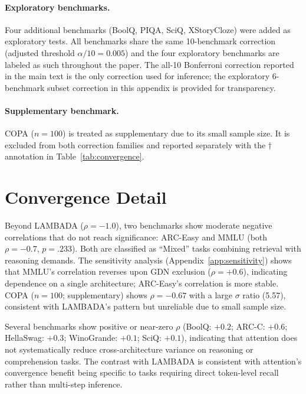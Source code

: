 \paragraph{Exploratory benchmarks.} Four additional benchmarks (BoolQ, PIQA, SciQ, XStoryCloze) were added as exploratory tests. All benchmarks share the same 10-benchmark correction (adjusted threshold $\alpha / 10 = 0.005$) and the four exploratory benchmarks are labeled as such throughout the paper. The all-10 Bonferroni correction reported in the main text is the only correction used for inference; the exploratory 6-benchmark subset correction in this appendix is provided for transparency.

\paragraph{Supplementary benchmark.} COPA ($n = 100$) is treated as supplementary due to its small sample size. It is excluded from both correction families and reported separately with the $\dagger$ annotation in Table~\ref{tab:convergence}.

\section{Convergence Detail}\label{app:convergence_detail}


Beyond LAMBADA ($\rho = -1.0$), two benchmarks show moderate negative correlations that do not reach significance: ARC-Easy and MMLU (both $\rho = -0.7$, $p = .233$). Both are classified as ``Mixed'' tasks combining retrieval with reasoning demands. The sensitivity analysis (Appendix~\ref{app:sensitivity}) shows that MMLU's correlation reverses upon GDN exclusion ($\rho = +0.6$), indicating dependence on a single architecture; ARC-Easy's correlation is more stable. COPA ($n = 100$; supplementary) shows $\rho = -0.67$ with a large $\sigma$ ratio (5.57), consistent with LAMBADA's pattern but unreliable due to small sample size.

Several benchmarks show positive or near-zero $\rho$ (BoolQ: $+0.2$; ARC-C: $+0.6$; HellaSwag: $+0.3$; WinoGrande: $+0.1$; SciQ: $+0.1$), indicating that attention does not systematically reduce cross-architecture variance on reasoning or comprehension tasks. The contrast with LAMBADA is consistent with attention's convergence benefit being specific to tasks requiring direct token-level recall \citep{arora2024zoology,arora2024based} rather than multi-step inference.


